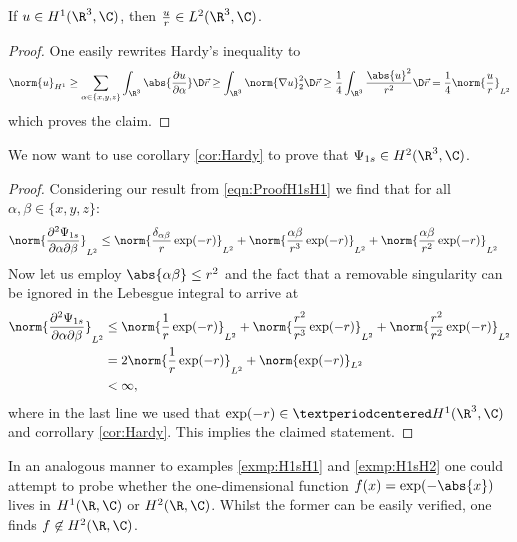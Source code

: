 \begin{cor}
	\label{cor:Hardy}
	If $u \in H^1(\R^3, \C)$, then $\frac{u}{r} \in L^2(\R^3, \C)$.
	\begin{proof}
		One easily rewrites Hardy's inequality to
		\[
			\norm{u}_{H^1} \geq  \sum_{\alpha\in\{x,y,z\}} \int_{\R^3} \abs{\frac{\partial u}{\partial \alpha}} \D\vec{r}
			\geq \int_{\R^3} \norm{\nabla u}_2^2 \D\vec{r}
			\geq \frac{1}{4} \int_{\R^3} \frac{\abs{u}^2}{r^2} \D\vec{r}
			= \frac{1}{4} \norm{\frac{u}{r}}_{L^2}
		\]
		which proves the claim.
	\end{proof}
\end{cor}

\begin{exmp}
	\label{exmp:H1sH2}
	We now want to use corollary \vref{cor:Hardy} to prove that
	$\Psi_{1s} \in H^2(\R^3,\C)$.
	\begin{proof}
		Considering our result from \eqref{eqn:ProofH1sH1}
		we find that for all $\alpha, \beta \in \{x,y,z\}$:
		\begin{align*}
			\norm{\frac{\partial^2 \Psi_{1s}}{\partial \alpha \partial \beta}}_{L^2}
			&\leq \norm{ \frac{\delta_{\alpha\beta}}{r} \exp(-r)}_{L^2}
			+ \norm{\frac{\alpha\beta}{r^3}\exp(-r)}_{L^2}
			+ \norm{\frac{\alpha\beta}{r^2}\exp(-r)}_{L^2}
		\end{align*}
		Now let us employ $\abs{\alpha\beta} \le r^2$
		and the fact that a removable singularity
		can be ignored in the Lebesgue integral to arrive at
		\begin{align*}
			\norm{\frac{\partial^2 \Psi_{1s}}{\partial \alpha \partial \beta}}_{L^2}
			&\leq \norm{\frac{1}{r} \exp(-r)}_{L^2}
			+ \norm{\frac{r^2}{r^3}\exp(-r)}_{L^2}
			+ \norm{\frac{r^2}{r^2}\exp(-r)}_{L^2} \\
			&= 2\norm{\frac{1}{r} \exp(-r)}_{L^2} + \norm{\exp(-r)}_{L^2} \\
			&< \infty,
		\end{align*}
		where in the last line we used that
		$\exp(-r) \in·H^1(\R^3, \C)$ and corrollary \vref{cor:Hardy}.
		This implies the claimed statement.
\end{proof}
\end{exmp}

\begin{exmp}
	In an analogous manner to examples \vref{exmp:H1sH1} and \vref{exmp:H1sH2}
	one could attempt to probe whether the one-dimensional function
	$f(x) = \exp(-\abs{x})$ lives in $H^1(\R,\C)$ or $H^2(\R,\C)$.
	Whilst the former can be easily verified,
	one finds $f \not\in H^2(\R,\C)$.
\end{exmp}

